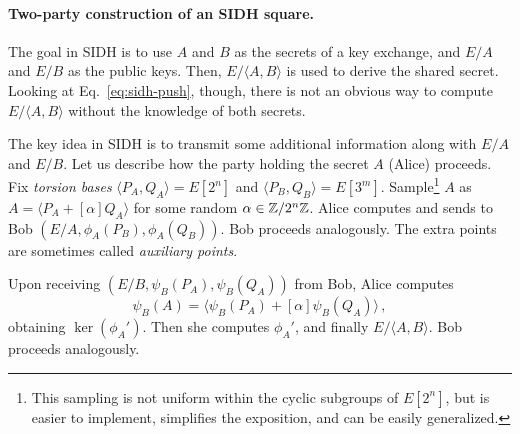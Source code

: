 \paragraph{Two-party construction of an SIDH square.}
The goal in SIDH is to use $A$ and $B$ as the secrets of a key exchange, and $E/A$ and $E/B$ as the public keys.
Then, $E/\langle A, B\rangle$ is used to derive the shared secret.
Looking at Eq.~\eqref{eq:sidh-push}, though, there is not an obvious way to compute $E/\langle A,B\rangle$ without the knowledge of both secrets.

The key idea in SIDH is to transmit some additional information along with $E/A$ and $E/B$.
Let us describe how the party holding the secret $A$ (Alice) proceeds.
Fix \emph{torsion bases} $\langle P_A, Q_A \rangle =  E[ 2^{n} ]$ and $\langle P_B, Q_B \rangle =  E[ 3^{m} ]$.
Sample\footnote{This sampling is not uniform within the cyclic subgroups of $E[2^n]$, but is easier to implement, simplifies the exposition, and can be easily generalized.} $A$ as $A = \langle P_A + [\alpha] Q_A \rangle$ for some random $\alpha \in \mathbb{Z}/2^n\mathbb{Z}$.
Alice computes and sends to Bob $(E/A, \phi_A(P_B), \phi_A(Q_B))$.
Bob proceeds analogously.
The extra points are sometimes called \emph{auxiliary points}.

Upon receiving $(E/B, \psi_B(P_A), \psi_B(Q_A))$ from Bob, Alice computes
\[\psi_B(A) = \langle \psi_B(P_A) + [\alpha]\psi_B(Q_A)\rangle \, ,\]
obtaining $\ker(\phi_A')$.
Then she computes $\phi_A'$, and finally $E/\langle A,B\rangle$.
Bob proceeds analogously.



